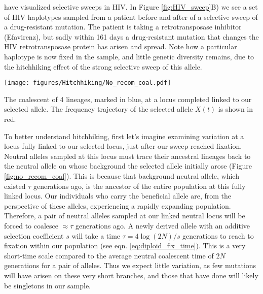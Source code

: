 \citet{Williams548198} have visualized selective sweeps in
HIV. In Figure \ref{fig:HIV_sweep}B) we see a set of HIV haplotypes
sampled from a patient before and after of a selective sweep of a
drug-resistant mutation. The patient is taking a
retrotransposase inhibitor (Efavirenz), but sadly within 161 days a
drug-resistant mutation that changes the HIV retrotransposase protein has arisen and spread. Note how a particular haplotype is now fixed in
the sample, and little genetic diversity remains, due to the
hitchhiking effect of the strong
selective sweep of this allele. 


\begin{marginfigure}
\begin{center}
\texttt{[image: figures/Hitchhiking/No\_recom\_coal.pdf]}
\end{center}
\caption{The coalescent of 4 lineages, marked in blue, at a locus completed linked to our selected allele. The frequency trajectory of the selected allele $X(t)$ is shown in red.} \label{fig:no_recom_coal}
\end{marginfigure}
To better understand hitchhiking, first let's imagine examining variation at a locus fully linked
to our selected locus, just after our sweep reached fixation. Neutral alleles sampled at this locus
must trace their ancestral lineages back to the neutral
allele on whose background the selected allele initially arose (Figure
\ref{fig:no_recom_coal}). This is because
that background neutral allele, which existed $\tau$ generations ago, is the
ancestor of the entire population at this fully linked locus. Our individuals who
carry the beneficial allele are, from the perspective of these 
alleles, experiencing a rapidly expanding population. Therefore, a
pair of neutral alleles sampled at our linked neutral locus will be forced to
coalesce $\approx \tau$ generations ago. A newly derived allele with an additive selection coefficient $s$ will
take a time $\tau = 4\log(2N)/s$ generations to reach to fixation
within our population (see eqn. \eqref{eq:diploid_fix_time}). This is a very
short-time scale compared to the average neutral coalescent time of
$2N$ generations for a pair of alleles. Thus we expect little variation,
as few mutations will have arisen on these very short branches, and
those that have done will likely be singletons in our sample. \\

